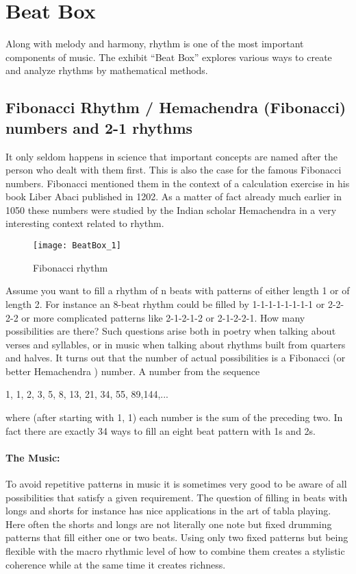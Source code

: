 \section{Beat Box}
Along with melody and harmony, rhythm is one of the most important components of music. The exhibit ``Beat Box'' explores various ways to create and analyze rhythms by mathematical methods.

\subsection{Fibonacci Rhythm / Hemachendra (Fibonacci) numbers and 2-1 rhythms}
It only seldom happens in science that important concepts are named after the person who dealt with them first. This is also the case for the famous Fibonacci numbers. Fibonacci mentioned them in the context of a calculation exercise in his book Liber Abaci published in 1202. As a matter of fact already much earlier in 1050 these numbers were studied by the Indian scholar Hemachendra in a very interesting context related to rhythm.

\begin{wrapfigure}{l}{0.4\textwidth}
\centering
\texttt{[image: BeatBox\_1]}
\caption*{Fibonacci rhythm}
\end{wrapfigure}
Assume you want to fill a rhythm of n beats with patterns of either length 1 or of length 2. For instance an 8-beat rhythm could be filled by 1-1-1-1-1-1-1-1 or 2-2-2-2 or more complicated patterns like 2-1-2-1-2 or 2-1-2-2-1. How many possibilities are there? Such questions arise both in poetry when talking about verses and syllables, or in music when talking about rhythms built from quarters and halves. It turns out that the number of actual possibilities is a Fibonacci (or better Hemachendra ) number. A number from the sequence

1, 1, 2, 3, 5, 8, 13, 21, 34, 55, 89,144,...

where (after starting with 1, 1) each number is the sum of the preceding two. In fact there are exactly 34 ways to fill an eight beat pattern with 1s and 2s. 

\paragraph{The Music:}
To avoid repetitive patterns in music it is sometimes very good to be aware of all possibilities that satisfy a given requirement. The question of filling in beats with longs and shorts for instance has nice applications in the art of tabla playing. Here often the shorts and longs are not literally one note but fixed drumming patterns that fill either one or two beats. Using only two fixed patterns but being flexible with the macro rhythmic level of how to combine them creates a stylistic coherence while at the same time it creates richness. 

